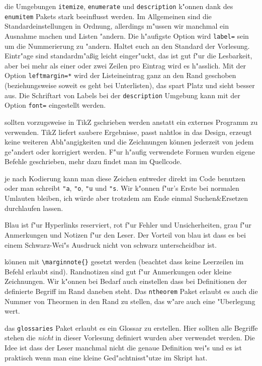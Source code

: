 \documentclass[paper=A4, twoside, chapterprefix=true, bibliography=totoc, headsepline]{scrbook}
\begin{document}
\begin{description}[font=\normalfont\itshape]
	die Umgebungen \verb|itemize|, \verb|enumerate| und \verb|description| k"onnen dank des \verb|enumitem| Pakets stark beeinflusst werden. Im Allgemeinen sind die Standardeinstellungen in Ordnung, allerdings m"ussen wir manchmal ein Ausnahme machen und Listen "andern. Die h"aufigste Option wird \verb|label=| sein um die Nummerierung zu "andern. Haltet euch an den Standard der Vorlesung. Eintr"age sind standardm"a\ss ig leicht einger"uckt, das ist gut f"ur die Lesbarkeit, aber bei mehr als einer oder zwei Zeilen pro Eintrag wird es h"asslich. Mit der Option \verb|leftmargin=*| wird der Listeineintrag ganz an den Rand geschoben (beziehungsweise soweit es geht bei Unterlisten), das spart Platz und sieht besser aus. Die Schriftart von Labels bei der \verb|description| Umgebung kann mit der Option \verb|font=| eingestellt werden.
\item[Zeichungen:]
	sollten vorzugsweise in TikZ gschrieben werden anstatt ein externes Programm zu verwenden. TikZ liefert saubere Ergebnisse, passt nahtlos in das Design, erzeugt keine weiteren Abh"angigkeiten und die Zeichnungen können jederzeit von jedem ge"andert oder korrigiert werden. F"ur h"aufig verwendete Formen wurden eigene Befehle geschrieben, mehr dazu findet man im Quellcode.
\item[Umlaute und "s:]
	je nach Kodierung kann man diese Zeichen entweder direkt im Code benutzen oder man schreibt \verb|"a|, \verb|"o|, \verb|"u| und \verb|"s|. Wir k"onnen f"ur's Erste bei normalen Umlauten bleiben, ich würde aber trotzdem am Ende einmal Suchen\&Ersetzen durchlaufen lassen.
\item[Farben:]
	Blau ist f"ur Hyperlinks reserviert, rot f"ur Fehler und Unsicherheiten, grau f"ur Anmerkungen und Notizen f"ur den Leser. Der Vorteil von blau ist dass es bei einem Schwarz-Wei"s Ausdruck nicht von schwarz unterscheidbar ist.
\item[Randnotizen:]
	können mit \verb|\marginnote{}| gesetzt werden (beachtet dass keine Leerzeilen im Befehl erlaubt sind). Randnotizen sind gut f"ur Anmerkungen oder kleine Zeichnungen. Wir k"onnen bei Bedarf auch einstellen dass bei Definitionen der definierte Begriff im Rand daneben steht. Das \verb|ntheorem| Paket erlaubt es auch die Nummer von Theormen in den Rand zu stellen, das w"are auch eine "Uberlegung wert.
\item[Glossareintr"age:]
	das \verb|glossaries| Paket erlaubt es ein Glossar zu erstellen. Hier sollten alle Begriffe stehen die \emph{nicht} in dieser Vorlesung definiert wurden aber verwendet werden. Die Idee ist dass der Leser manchmal nicht die genaue Definition wei"s und es ist praktisch wenn man eine kleine Ged"achtnisst"utze im Skript hat.
\end{description}
\end{document}
